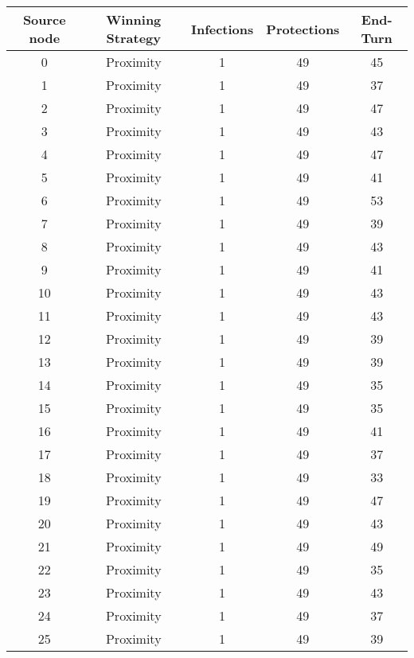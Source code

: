 \documentclass[results.tex]{subfiles}
\begin{document}
\begin{center}
  \begin{tabular}{| c || c | c | c | c |}
    \hline
    {\bfseries Source node} & {\bfseries Winning Strategy} & {\bfseries Infections} & {\bfseries Protections} & {\bfseries End-Turn} \\  %
    \hline\hline
    0 & Proximity & 1 & 49 & 45 \\ 
    \hline
    1 & Proximity & 1 & 49 & 37 \\ 
    \hline
    2 & Proximity & 1 & 49 & 47 \\ 
    \hline
    3 & Proximity & 1 & 49 & 43 \\ 
    \hline
    4 & Proximity & 1 & 49 & 47 \\ 
    \hline
    5 & Proximity & 1 & 49 & 41 \\ 
    \hline
    6 & Proximity & 1 & 49 & 53 \\ 
    \hline
    7 & Proximity & 1 & 49 & 39 \\ 
    \hline
    8 & Proximity & 1 & 49 & 43 \\ 
    \hline
    9 & Proximity & 1 & 49 & 41 \\ 
    \hline
    10 & Proximity & 1 & 49 & 43 \\ 
    \hline
    11 & Proximity & 1 & 49 & 43 \\ 
    \hline
    12 & Proximity & 1 & 49 & 39 \\ 
    \hline
    13 & Proximity & 1 & 49 & 39 \\ 
    \hline
    14 & Proximity & 1 & 49 & 35 \\ 
    \hline
    15 & Proximity & 1 & 49 & 35 \\ 
    \hline
    16 & Proximity & 1 & 49 & 41 \\ 
    \hline
    17 & Proximity & 1 & 49 & 37 \\ 
    \hline
    18 & Proximity & 1 & 49 & 33 \\ 
    \hline
    19 & Proximity & 1 & 49 & 47 \\ 
    \hline
    20 & Proximity & 1 & 49 & 43 \\ 
    \hline
    21 & Proximity & 1 & 49 & 49 \\ 
    \hline
    22 & Proximity & 1 & 49 & 35 \\ 
    \hline
    23 & Proximity & 1 & 49 & 43 \\ 
    \hline
    24 & Proximity & 1 & 49 & 37 \\ 
    \hline
    25 & Proximity & 1 & 49 & 39 \\ 

\end{tabular}
\end{center}
\end{document}
